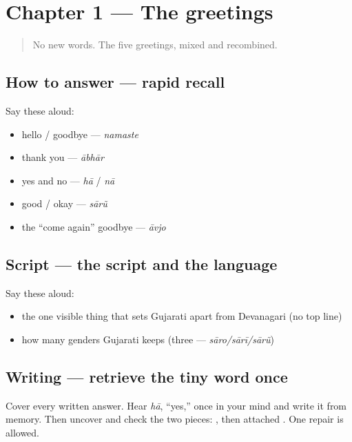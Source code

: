 \section[Practice]{Chapter 1 — The greetings}

\label{lesson:GU-C01-practice}



\begin{quote}
No new words. The five greetings, mixed and recombined.
\end{quote}

\subsection*{How to answer — rapid recall}
Say these aloud:

\begin{itemize}
\raggedright
  \item hello / goodbye — \emph{namaste}
  \item thank you — \emph{ābhār}
  \item yes and no — \emph{hā} / \emph{nā}
  \item good / okay — \emph{sārũ}
  \item the \textquotedblleft{}come again\textquotedblright{} goodbye — \emph{āvjo}
\end{itemize}

\subsection*{Script — the script and the language}
Say these aloud:

\begin{itemize}
\raggedright
  \item the one visible thing that sets Gujarati apart from Devanagari (no top line)
  \item how many genders Gujarati keeps (three — \emph{sāro/sārī/sārũ})
\end{itemize}

\subsection*{Writing — retrieve the tiny word once}
Cover every written answer. Hear \emph{hā}, \textquotedblleft{}yes,\textquotedblright{} once in your mind and write it from memory. Then uncover \textbf{} and check the two pieces: \textbf{}, then attached \textbf{}. One repair is allowed.

